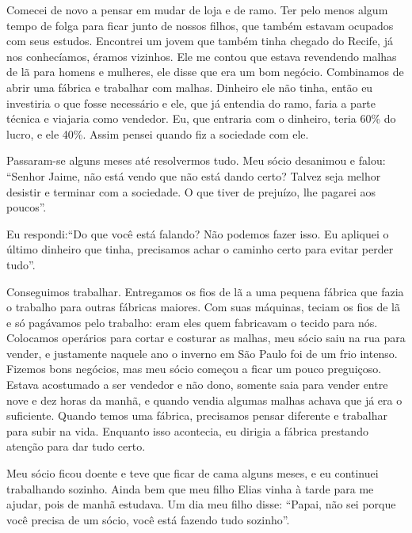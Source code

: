 Comecei de novo a pensar em mudar de loja e de ramo. Ter pelo menos
algum tempo de folga para ficar junto de nossos filhos, que também
estavam ocupados com seus estudos. Encontrei um jovem que também tinha
chegado do Recife, já nos conhecíamos, éramos vizinhos. Ele me contou
que estava revendendo malhas de lã para
homens e mulheres, ele disse que era um bom negócio.
Combinamos de abrir uma fábrica e trabalhar com malhas. Dinheiro ele
não tinha, então eu investiria o que fosse necessário e ele, que já entendia do ramo, faria a parte
técnica e viajaria como vendedor. Eu, que entraria com o dinheiro,
teria 60\% do lucro, e ele 40\%. Assim pensei quando fiz a
sociedade com ele.


Passaram-se alguns meses até resolvermos tudo. Meu sócio desanimou e
falou: ``Senhor Jaime, não está vendo que não está dando certo?
Talvez seja melhor desistir e terminar com a sociedade. O que tiver de
prejuízo, lhe pagarei aos poucos''.

Eu respondi:``Do que você está falando? Não podemos fazer isso. Eu
apliquei o último dinheiro que tinha, precisamos achar o caminho certo
para evitar perder tudo''.

Conseguimos trabalhar. Entregamos os fios de lã a uma pequena fábrica
que fazia o trabalho para outras fábricas maiores. Com suas máquinas,
teciam os fios de lã e só pagávamos pelo trabalho: eram eles quem fabricavam
o tecido para nós. Colocamos operários para cortar e costurar as malhas,
meu sócio saiu na rua para vender, e justamente naquele ano o inverno em São Paulo foi
de um frio intenso. Fizemos bons negócios, mas meu sócio
começou a ficar um pouco preguiçoso. Estava acostumado a ser vendedor
e não dono, somente saia para vender entre nove e dez horas da manhã, e
quando vendia algumas malhas achava que já era o suficiente. Quando
temos uma fábrica, precisamos pensar diferente e trabalhar para subir na
vida. Enquanto isso acontecia, eu dirigia a fábrica prestando
atenção para dar tudo certo.

Meu sócio ficou doente e teve que ficar de cama alguns meses, e eu
continuei trabalhando sozinho. Ainda bem que meu filho Elias vinha à
tarde para me ajudar, pois de manhã estudava. Um dia meu filho
disse: ``Papai, não sei porque você precisa de um sócio, você está
fazendo tudo sozinho''.

